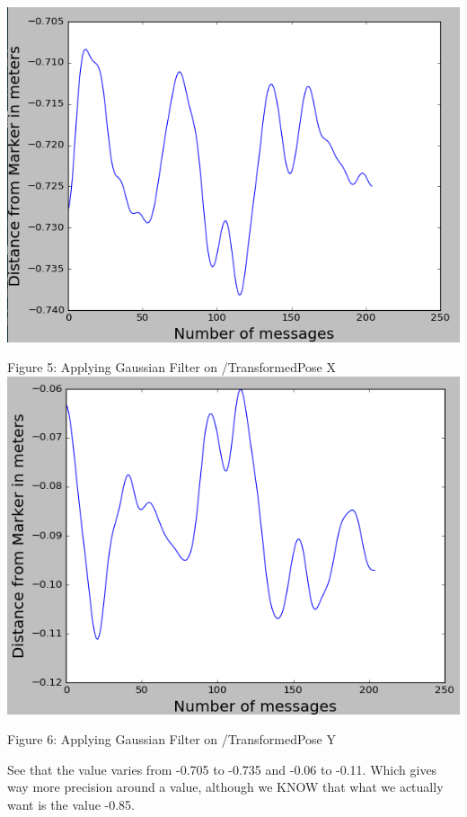 \documentclass{article}
\begin{document}
\begin{center}
    \includegraphics[scale=0.5]{pic10.png}
    
    Figure 5: Applying Gaussian Filter on /TransformedPose X
    \includegraphics[scale=0.5]{pic11.png}
    
    Figure 6: Applying Gaussian Filter on /TransformedPose Y
\end{center}

See that the value varies from -0.705 to -0.735 and -0.06 to -0.11. Which gives way more precision around a value, although we KNOW that what we actually want is the value -0.85.
\end{document}
